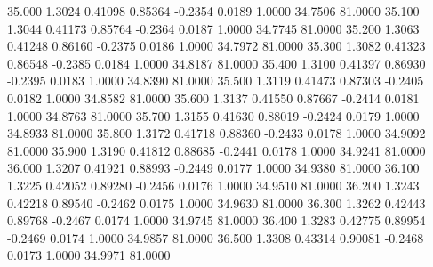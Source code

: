   35.000   1.3024   0.41098   0.85364  -0.2354   0.0189   1.0000  34.7506  81.0000
  35.100   1.3044   0.41173   0.85764  -0.2364   0.0187   1.0000  34.7745  81.0000
  35.200   1.3063   0.41248   0.86160  -0.2375   0.0186   1.0000  34.7972  81.0000
  35.300   1.3082   0.41323   0.86548  -0.2385   0.0184   1.0000  34.8187  81.0000
  35.400   1.3100   0.41397   0.86930  -0.2395   0.0183   1.0000  34.8390  81.0000
  35.500   1.3119   0.41473   0.87303  -0.2405   0.0182   1.0000  34.8582  81.0000
  35.600   1.3137   0.41550   0.87667  -0.2414   0.0181   1.0000  34.8763  81.0000
  35.700   1.3155   0.41630   0.88019  -0.2424   0.0179   1.0000  34.8933  81.0000
  35.800   1.3172   0.41718   0.88360  -0.2433   0.0178   1.0000  34.9092  81.0000
  35.900   1.3190   0.41812   0.88685  -0.2441   0.0178   1.0000  34.9241  81.0000
  36.000   1.3207   0.41921   0.88993  -0.2449   0.0177   1.0000  34.9380  81.0000
  36.100   1.3225   0.42052   0.89280  -0.2456   0.0176   1.0000  34.9510  81.0000
  36.200   1.3243   0.42218   0.89540  -0.2462   0.0175   1.0000  34.9630  81.0000
  36.300   1.3262   0.42443   0.89768  -0.2467   0.0174   1.0000  34.9745  81.0000
  36.400   1.3283   0.42775   0.89954  -0.2469   0.0174   1.0000  34.9857  81.0000
  36.500   1.3308   0.43314   0.90081  -0.2468   0.0173   1.0000  34.9971  81.0000
